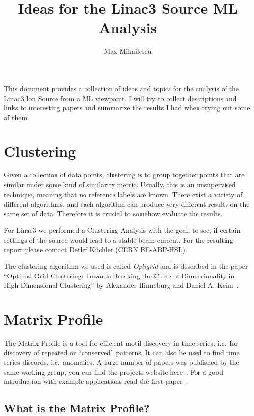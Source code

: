 \documentclass[12pt,a4paper]{article}
\title{Ideas for the Linac3 Source ML Analysis}
\author{Max Mihailescu}
\date{}
\begin{document}
\maketitle

This document provides a collection of ideas and topics for the analysis of the Linac3 Ion Source from a ML viewpoint. I will try to collect descriptions and links to interesting papers and summarize the results I had when trying out some of them.

\hypertarget{clustering}{%
\section{Clustering}\label{clustering}}

Given a collection of data points, clustering is to group together points that are similar under some kind of similarity metric. Usually,
this is an unsupervised technique, meaning that no reference labels are known. There exist a variety of different algorithms, and each algorithm can produce very different results on the same set of data. Therefore it is crucial to somehow evaluate the results.

For Linac3 we performed a Clustering Analysis with the goal, to see, if certain settings of the source would lead to a stable beam current. For the resulting report please contact Detlef Küchler (CERN BE-ABP-HSL).

The clustering algorithm we used is called \emph{Optigrid} and is described in the paper ``Optimal Grid-Clustering: Towards Breaking the
Curse of Dimensionality in High-Dimensional Clustering'' by Alexander Hinneburg and Daniel A. Keim~\cite{Hinneburg:OptimalGridClustering}.

\hypertarget{matrix-profile}{%
\section{Matrix Profile}\label{matrix-profile}}

The Matrix Profile is a tool for efficient motif discovery in time series, i.e.~for discovery of repeated or ``conserved'' patterns. It can also be used to find time series discords, i.e.~anomalies. A large number of papers was published by the same working group, you can find the projects website here~\cite{Keogh:UCRMatrixProfile}. For a good introduction with example applications read the first paper~\cite{Yeh:MatrixProfileI}.

\hypertarget{what-is-the-matrix-profile}{%
\subsection{What is the Matrix Profile?}\label{what-is-the-matrix-profile}}
\end{document}
